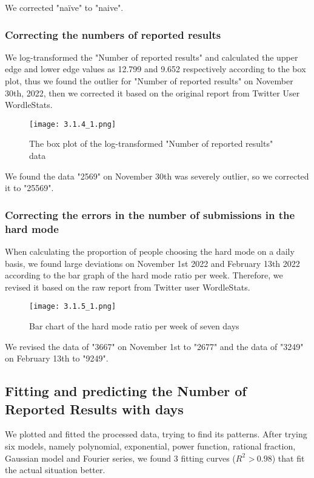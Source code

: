 \documentclass[12pt]{article}  %
\begin{document}
We corrected "naïve" to "naive".

\subsubsection{Correcting the numbers of reported results}

We log-transformed the "Number of reported results" and calculated the upper edge and lower edge values as 12.799 and 9.652 respectively according to the box plot, thus we found the outlier for "Number of reported results" on November 30th, 2022, then we corrected it based on the original report from Twitter User WordleStats.

\begin{figure}[h!]
\centering
\texttt{[image: 3.1.4\_1.png]}
\caption{The box plot of the log-transformed "Number of reported results" data}
\label{fig:result}
\end{figure}


We found the data "2569" on November 30th was severely outlier, so we corrected it to "25569".

\subsubsection{Correcting the errors in the number of submissions in the hard mode}

When calculating the proportion of people choosing the hard mode on a daily basis, we found large deviations on November 1st 2022 and February 13th 2022 according to the bar graph of the hard mode ratio per week. Therefore, we revised it based on the raw report from Twitter user WordleStats.

\vspace{-0.5cm}
\begin{figure}[h!]
\centering
\texttt{[image: 3.1.5\_1.png]}
\caption{Bar chart of the hard mode ratio per week of seven days}
\label{fig:result}
\end{figure}

We revised the data of "3667" on November 1st to "2677" and the data of "3249" on February 13th to "9249".

\subsection{Fitting and predicting the Number of Reported Results with days}
We plotted and fitted the processed data, trying to find its patterns. After trying six models, namely polynomial, exponential, power function, rational fraction, Gaussian model and Fourier series, we found 3 fitting curves ($R^{2}$ \textgreater $\ 0.98$)  that fit the actual situation better.
\end{document}
